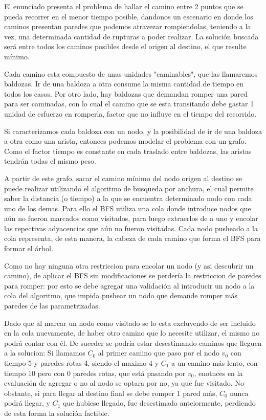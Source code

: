 El enunciado presenta el problema de hallar el camino entre 2 puntos que se pueda recorrer en el menor tiempo posible, dandonos un escenario en donde los caminos presentan paredes que podemos atravezar rompiendolas, teniendo a la vez, una determinada cantidad de rupturas a poder realizar. La solución buscada será entre todos los caminos posibles desde el origen al destino, el que resulte mínimo.

Cada camino esta compuesto de unas unidades "caminables", que las llamaremos baldozas. Ir de una baldoza a otra consume la misma cantidad de tiempo en todos los casos. Por otro lado, hay 
baldozas que demandan romper una pared para ser caminadas, con lo cual el camino que se esta transitando debe gastar 1 unidad de esfuerzo en romperla, factor que no influye en el tiempo del recorrido.

Si caracterizamos cada baldoza con un nodo, y la posibilidad de ir de una baldoza a otra como una arista, entonces podemos modelar el problema con un grafo. Como el factor tiempo es constante en cada traslado entre baldozas, las aristas tendrán todas el mismo peso.

A partir de este grafo, sacar el camino mínimo del nodo origen al destino se puede realizar utilizando el algoritmo de busqueda por anchura, el cual permite saber la distancia (o tiempo) a la que se encuentra determinado nodo con cada uno de los demas. Para ello el BFS utiliza una cola donde introduce nodos que aún no fueron marcados como visitados, para luego extraerlos de a uno y encolar las repectivas adyacencias que aún no fueron visitadas. Cada nodo pusheado a la cola representa, de esta manera, la cabeza de cada camino que forma el BFS para formar el árbol. 

Como no hay ninguna otra restriccion para encolar un nodo (y asi descubrir un camino), de aplicar el BFS sin modificaciones se perdería la restriccion de paredes para romper: por esto se debe agregar una validación al introducir un nodo a la cola del algoritmo, que impida pushear un nodo que demande romper más paredes de las parametrizadas.

Dado que al marcar un nodo como visitado se lo esta excluyendo de ser incluido en la cola nuevamente, de haber otro camino que lo necesite utilizar, el mismo no podrá contar con él. De suceder se podria estar desestimando caminos que lleguen a la solucion: Si llamamos $C_0$ al primer camino que paso por el nodo $v_0$ con tiempo 5 y paredes rotas 4, siendo el maximo 4 y $C_1$ a un camino más lento, con tiempo 10 pero con 0 paredes rotas, que está pasando por $v_0$, enotnces en la evaluación de agregar o no al nodo se optara por no, ya que fue visitado. No obstante, si para llegar al destino final se debe romper 1 pared más, $C_0$ nunca podrá llegar, y $C_1$ que hubiese llegado, fue desestimado anteiormente, perdiendo de esta forma la solución factible.

